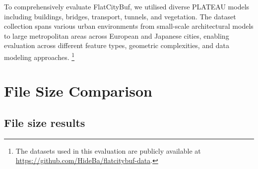 To comprehensively evaluate FlatCityBuf, we utilised diverse PLATEAU models including buildings, bridges, transport, tunnels, and vegetation. The dataset collection spans various urban environments from small-scale architectural models to large metropolitan areas across European and Japanese cities, enabling evaluation across different feature types, geometric complexities, and data modeling approaches. \footnote{The datasets used in this evaluation are publicly available at \url{https://github.com/HideBa/flatcitybuf-data}.}

\section{File Size Comparison}
\label{result:file_size_comparison}

\subsection{File size results}
\label{result:overview:filesize_comparison}

